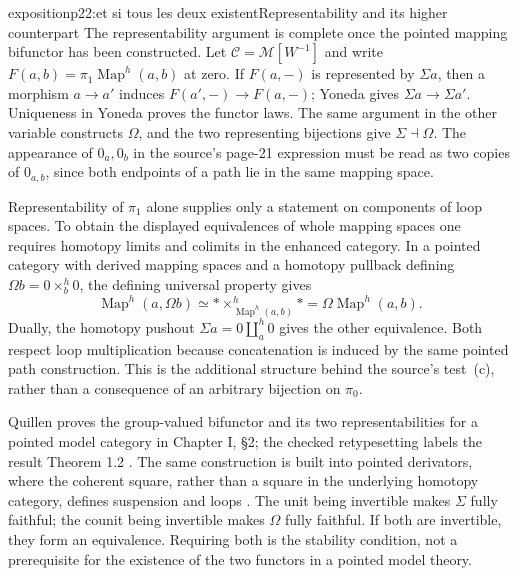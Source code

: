\begin{dcomment}{exposition}{p22:et si tous les deux existent}{Representability and its higher counterpart}
The representability argument is complete once the pointed mapping bifunctor has been constructed. Let $\mathcal C=\mathcal M[W^{-1}]$ and write $F(a,b)=\pi_1\operatorname{Map}^{h}(a,b)$ at zero. If $F(a,-)$ is represented by $\Sigma a$, then a morphism $a\to a'$ induces $F(a',-)\to F(a,-)$; Yoneda gives $\Sigma a\to\Sigma a'$. Uniqueness in Yoneda proves the functor laws. The same argument in the other variable constructs $\Omega$, and the two representing bijections give $\Sigma\dashv\Omega$. The appearance of $0_a,0_b$ in the source's page-21 expression must be read as two copies of $0_{a,b}$, since both endpoints of a path lie in the same mapping space.

Representability of $\pi_1$ alone supplies only a statement on components of loop spaces. To obtain the displayed equivalences of whole mapping spaces one requires homotopy limits and colimits in the enhanced category. In a pointed category with derived mapping spaces and a homotopy pullback defining $\Omega b=0\times_b^h0$, the defining universal property gives
\[
 \operatorname{Map}^{h}(a,\Omega b)
  \simeq *\times_{\operatorname{Map}^{h}(a,b)}^h*
  =\Omega\operatorname{Map}^{h}(a,b).
\]
Dually, the homotopy pushout $\Sigma a=0\amalg_a^h0$ gives the other equivalence. Both respect loop multiplication because concatenation is induced by the same pointed path construction. This is the additional structure behind the source's test~(c), rather than a consequence of an arbitrary bijection on $\pi_0$.

Quillen proves the group-valued bifunctor and its two representabilities for a pointed model category in Chapter I, \S2; the checked retypesetting labels the result Theorem 1.2 \citep{Quillen1967}. The same construction is built into pointed derivators, where the coherent square, rather than a square in the underlying homotopy category, defines suspension and loops \citep[Definition 3.16 and Proposition 3.17]{Groth2013}. The unit being invertible makes $\Sigma$ fully faithful; the counit being invertible makes $\Omega$ fully faithful. If both are invertible, they form an equivalence. Requiring both is the stability condition, not a prerequisite for the existence of the two functors in a pointed model theory.


\end{dcomment}
